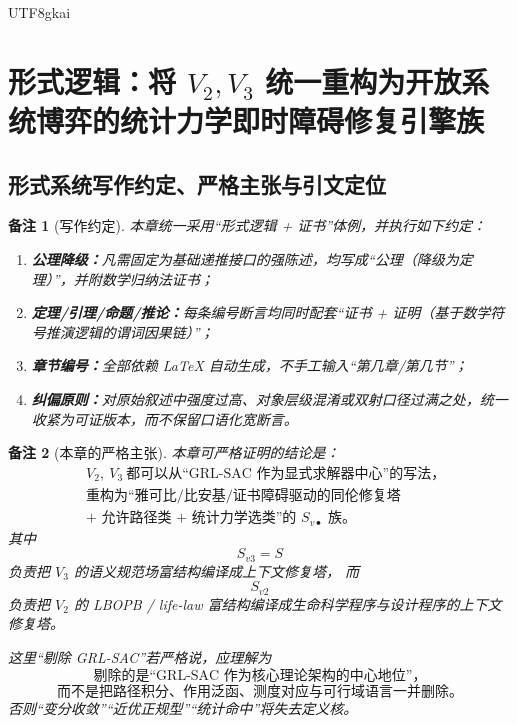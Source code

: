 \documentclass[12pt]{article}
\newtheorem{remark}{备注}[section]
\begin{document}
\begin{CJK*}{UTF8}{gkai}
\setcounter{tocdepth}{3}
\setcounter{secnumdepth}{3}
\tableofcontents
\clearpage

\section{形式逻辑：将 \texorpdfstring{$V_2,V_3$}{V2,V3} 统一重构为开放系统博弈的统计力学即时障碍修复引擎族}
\label{sec:tex39-ch1}

\subsection{形式系统写作约定、严格主张与引文定位}
\label{subsec:tex39-ch1-convention}

\begin{remark}[写作约定]
本章统一采用“形式逻辑 + 证书”体例，并执行如下约定：
\begin{enumerate}
  \item \textbf{公理降级：}凡需固定为基础递推接口的强陈述，均写成“公理（降级为定理）”，并附数学归纳法证书；
  \item \textbf{定理/引理/命题/推论：}每条编号断言均同时配套“证书 + 证明（基于数学符号推演逻辑的谓词因果链）”；
  \item \textbf{章节编号：}全部依赖 \LaTeX{} 自动生成，不手工输入“第几章/第几节”；
  \item \textbf{纠偏原则：}对原始叙述中强度过高、对象层级混淆或双射口径过满之处，统一收紧为可证版本，而不保留口语化宽断言。
\end{enumerate}
\end{remark}

\begin{remark}[本章的严格主张]
本章可严格证明的结论是：
\[
  \boxed{
    \begin{aligned}
      &V_2,\ V_3\ \text{都可以从“GRL-SAC 作为显式求解器中心”的写法，}\\
      &\text{重构为“雅可比/比安基/证书障碍驱动的同伦修复塔}\\
      &\text{+ 允许路径类 + 统计力学选类”的 }S_{v\bullet}\text{ 族。}
    \end{aligned}
  }
\]
其中
\[
  S_{v3}=S
\]
负责把 $V_3$ 的语义规范场富结构编译成上下文修复塔，
而
\[
  S_{v2}
\]
负责把 $V_2$ 的 LBOPB / life-law 富结构编译成生命科学程序与设计程序的上下文修复塔。

这里“剔除 GRL-SAC”若严格说，应理解为
\[
  \boxed{
    \text{剔除的是“GRL-SAC 作为核心理论架构的中心地位”，}
  }
\]
\[
  \boxed{
    \text{而不是把路径积分、作用泛函、测度对应与可行域语言一并删除。}
  }
\]
否则“变分收敛”“近优正规型”“统计命中”将失去定义核。
\end{remark}


\end{CJK*}
\end{document}

